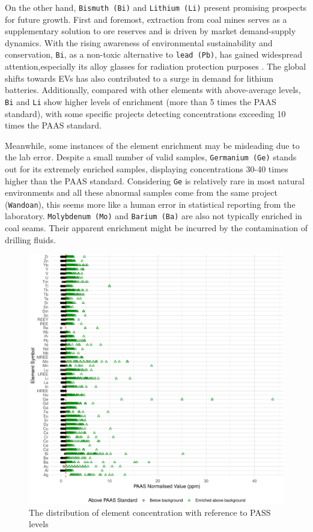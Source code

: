 \documentclass[11pt,a4paper,]{article}
\begin{document}
On the other hand, \texttt{Bismuth\ (Bi)} and \texttt{Lithium\ (Li)} present promising prospects for future growth. First and foremost, extraction from coal mines serves as a supplementary solution to ore reserves and is driven by market demand-supply dynamics. With the rising awareness of environmental sustainability and conservation, \texttt{Bi}, as a non-toxic alternative to \texttt{lead\ (Pb)}, has gained widespread attention,especially its alloy glasses for radiation protection purposes \autocite{Buriahi2021}. The global shifts towards EVs has also contributed to a surge in demand for lithium batteries. Additionally, compared with other elements with above-average levels, \texttt{Bi} and \texttt{Li} show higher levels of enrichment (more than 5 times the PAAS standard), with some specific projects detecting concentrations exceeding 10 times the PAAS standard.

Meanwhile, some instances of the element enrichment may be misleading due to the lab error. Despite a small number of valid samples, \texttt{Germanium\ (Ge)} stands out for its extremely enriched samples, displaying concentrations 30-40 times higher than the PAAS standard. Considering \texttt{Ge} is relatively rare in most natural environments and all these abnormal samples come from the same project (\texttt{Wandoan}), this seems more like a human error in statistical reporting from the laboratory. \texttt{Molybdenum\ (Mo)} and \texttt{Barium\ (Ba)} are also not typically enriched in coal seams. Their apparent enrichment might be incurred by the contamination of drilling fluids.

\begin{figure}
\includegraphics[width=1\linewidth,height=1\textheight]{Final_report_files/figure-latex/paaslvlcode-1} \caption{The distribution of element concentration with reference to PASS levels}\label{fig:paaslvlcode}
\end{figure}
\end{document}
